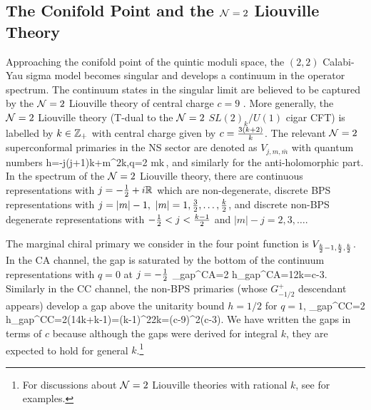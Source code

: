\documentclass[12pt]{article}
\begin{document}
\subsection{The Conifold Point and the ${\mathcal N}=2$ Liouville Theory}
\label{ap:liouville}
Approaching the conifold point of the quintic moduli space, the $(2,2)$ Calabi-Yau sigma model becomes singular and develops a continuum in the operator spectrum. 
The continuum states in the singular limit are believed to be captured by the ${\mathcal N}=2$ Liouville theory of central charge $c=9$ \cite{Ooguri:1995wj}. 
 More generally, the ${\mathcal N}=2$ Liouville theory (T-dual to the ${\mathcal N}=2$ $SL(2)_k/U(1)$ cigar CFT) is labelled by $k\in \mathbb{Z}_+$ with central charge given by $c={3(k+2)\over k}$. The relevant ${\mathcal N}=2$ superconformal primaries in the NS sector are denoted as $V_{j,m,\bar m}$ with quantum numbers
\ie
h=-{j(j+1)\over k}+{m^2\over k},\quad q={2 m\over k}\,,
\fe
and similarly for the anti-holomorphic part. In the spectrum of the ${\mathcal N}=2$ Liouville theory, there are  continuous representations with $j=-{1\over 2}+i \mathbb{R}$ which are  non-degenerate, discrete BPS representations with $j=|m|-1,~|m|=1,{3\over 2},\dots, {k\over 2}$, and  discrete non-BPS degenerate representations with $-{1\over 2}<j<{k-1\over 2}$ and $|m|-j=2,3,\dots$. 

The marginal chiral primary we consider in the four point function is $V_{{k\over 2}-1,{k\over 2},{k\over 2}}$. In the CA channel, the gap is saturated by the bottom of the continuum representations with $q=0$ at $j=-{1\over 2}$
\ie
\Delta_{gap}^{CA}=2 h_{gap}^{CA}={1\over 2k}={c-3}.
\fe
Similarly in the CC channel, the non-BPS primaries (whose $G^+_{-1/2}$ descendant appears) develop a  gap above the unitarity bound $h=1/2$ for $q=1$, 
\ie
\Delta_{gap}^{CC}=2 h_{gap}^{CC}=2\left({1\over 4k}+{k}-{1}\right)={(k-1)^2\over 2k}={(c-9)^2(c-3)}.
\fe
We have written the gaps in terms of $c$ because although the gaps were derived for integral $k$, they are expected to hold for general $k$.\footnote{For discussions about ${\mathcal N}=2$ Liouville theories with rational $k$, see \cite{Eguchi:2003ik,Eguchi:2004ik} for examples.} 
\end{document}
